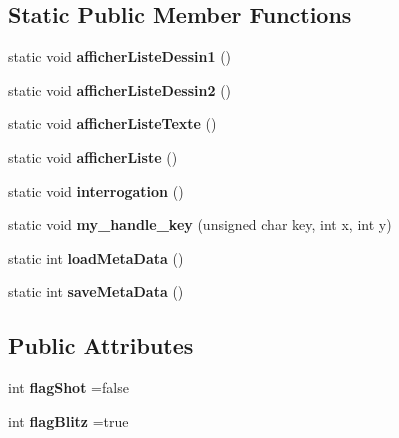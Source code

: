 \subsection*{Static Public Member Functions}
\begin{DoxyCompactItemize}
\item 
\mbox{\label{classbergson_a774df0ea089cb593db12e2b980b336d4}} 
static void {\bfseries afficher\+Liste\+Dessin1} ()
\item 
\mbox{\label{classbergson_a1d7a5125217c84b96abd7cb1793afc28}} 
static void {\bfseries afficher\+Liste\+Dessin2} ()
\item 
\mbox{\label{classbergson_a3dd5969ef6299d9902c3cce78217a430}} 
static void {\bfseries afficher\+Liste\+Texte} ()
\item 
\mbox{\label{classbergson_a224c24ef264c355926da80acabcbc22f}} 
static void {\bfseries afficher\+Liste} ()
\item 
\mbox{\label{classbergson_a4b0d0f23b70161af6f9f94e78a471aa1}} 
static void {\bfseries interrogation} ()
\item 
\mbox{\label{classbergson_a70cc65d6f4fbc608082935d22d98b4f9}} 
static void {\bfseries my\+\_\+handle\+\_\+key} (unsigned char key, int x, int y)
\item 
\mbox{\label{classbergson_ac378f7da7d2406749df15840b6524d06}} 
static int {\bfseries load\+Meta\+Data} ()
\item 
\mbox{\label{classbergson_ae436fb8b3e5602f472fd12a1e879a7f8}} 
static int {\bfseries save\+Meta\+Data} ()
\end{DoxyCompactItemize}
\subsection*{Public Attributes}
\begin{DoxyCompactItemize}
\item 
\mbox{\label{classbergson_af35b3141b167e275aefbd303651b2f69}} 
int {\bfseries flag\+Shot} =false
\item 
\mbox{\label{classbergson_a5a7bcc65387a9f8f80e65ef7296ee8c7}} 
int {\bfseries flag\+Blitz} =true
\end{DoxyCompactItemize}
